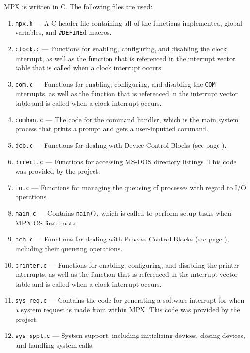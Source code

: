 MPX is written in C. The following files are used:
\begin{enumerate}
    \item {\tt mpx.h} --- A C header file containing all of the functions implemented, global variables, and {\tt \#DEFINE}d macros.
    \item {\tt clock.c} --- Functions for enabling, configuring, and disabling the clock interrupt, as well as the function that is referenced in the interrupt vector table that is called when a clock interrupt occurs.
    \item {\tt com.c} --- Functions for enabling, configuring, and disabling the {\tt COM} interrupts, as well as the function that is referenced in the interrupt vector table and is called when a clock interrupt occurs.
    \item {\tt comhan.c} --- The code for the command handler, which is the main system process that prints a prompt and gets a user-inputted command.
    \item {\tt dcb.c} --- Functions for dealing with Device Control Blocks (see page \pageref{device_control_block}).
    \item {\tt direct.c} --- Functions for accessing MS-DOS directory listings. This code was provided by the project.
    \item {\tt io.c} --- Functions for managing the queueing of processes with regard to I/O operations.
    \item {\tt main.c} --- Contains {\tt main()}, which is called to perform setup tasks when MPX-OS first boots.
    \item {\tt pcb.c} --- Functions for dealing with Process Control Blocks (see page \pageref{process_control_block}), including their queueing operations.
    \item {\tt printer.c} --- Functions for enabling, configuring, and disabling the printer interrupts, as well as the function that is referenced in the interrupt vector table and is called when a clock interrupt occurs.
    \item {\tt sys\_req.c} --- Contains the code for generating a software interrupt for when a system request is made from within MPX. This code was provided by the project.
    \item {\tt sys\_sppt.c} --- System support, including initializing devices, closing devices, and handling system calls.
\end{enumerate}

